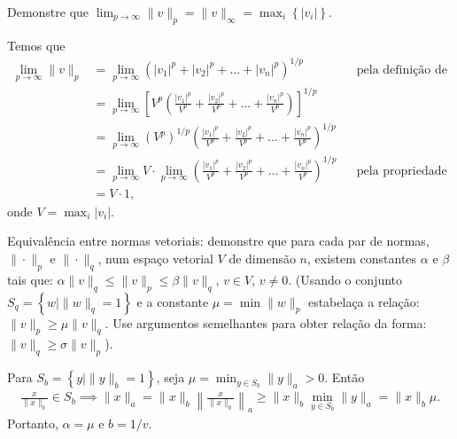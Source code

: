 \begin{questions}
    \question Demonstre que $\lim_{p \rightarrow \infty} \| v \|_p = \| v \|_\infty = \max_i \left\{ | v_i | \right\}$.
    \begin{solution}
        Temos que
        \begin{align*}
            \lim_{p \to \infty} \| v \|_p &= \lim_{p \to \infty} \left( | v_1 |^p + | v_2 |^p + \ldots + | v_n |^p \right)^{1 / p} && \text{pela defini\c{c}\~{a}o de norma} \\
            &= \lim_{p \to \infty} \left[ V^p \left( \frac{| v_1 |^p}{V^p} + \frac{| v_2 |^p}{V^p} + \ldots + \frac{| v_n |^p}{V^p} \right) \right]^{1 / p} \\
            &= \lim_{p \to \infty} \left( V^p \right)^{1 / p} \left( \frac{| v_1 |^p}{V^p} + \frac{| v_2 |^p}{V^p} + \ldots + \frac{| v_n |^p}{V^p} \right)^{1 / p} \\
            &= \lim_{p \to \infty} V \cdot \lim_{p \to \infty} \left( \frac{| v_1 |^p}{V^p} + \frac{| v_2 |^p}{V^p} + \ldots + \frac{| v_n |^p}{V^p} \right)^{1 / p} && \text{pela propriedade do limite}\\
            &= V \cdot 1,
        \end{align*}
        onde $V = \max_i | v_i |$.
    \end{solution}

     Equival\^{e}ncia entre normas vetoriais: demonstre que para cada par de normas, $\| \cdot \|_p$ e $\| \cdot \|_q$, num espa\c{c}o vetorial $V$ de dimens\~{a}o $n$, existem constantes $\alpha$ e $\beta$ tais que: $\alpha \| v \|_q \leq \| v \|_p \leq \beta \| v \|_q$, $v \in V$, $v \neq 0$. (Usando o conjunto $S_q = \left\{ w \mid \| w \|_q = 1 \right\}$ e a constante $\mu = \min \| w \|_p$ estabela\c{c}a a rela\c{c}\~{a}o: $\| v \|_p \geq \mu \| v \|_q$. Use argumentos semelhantes para obter rela\c{c}\~{a}o da forma: $\| v \|_q \geq \sigma \| v \|_p$).
    \begin{solution}
        Para $S_b = \left\{ y \mid \| y \|_b = 1 \right\}$, seja $\mu = \min_{y \in S_b} \| y \|_a > 0$. Ent\~{a}o
        \begin{align*}
            \frac{x}{\| x \|_b} \in S_b \implies \| x \|_a = \| x \|_b \left\| \frac{x}{\| x \|_b} \right \|_a \geq \| x \|_b \min_{y \in S_b} \| y \|_a = \| x \|_b \mu.
        \end{align*}
         Portanto, $\alpha = \mu$ e $b = 1 / v$.
    \end{solution}


\end{questions}

